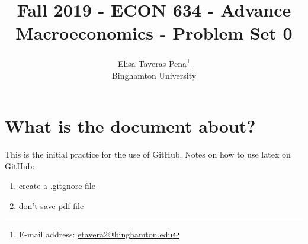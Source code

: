 \documentclass[12pt]{article}%
\begin{document}
\title{Fall 2019 - ECON 634 - Advance Macroeconomics - Problem Set 0}
\author{Elisa Taveras Pena\footnote{E-mail address: \href{mailto:etavera2@binghamton.edu}{etavera2@binghamton.edu}  }\\
Binghamton University}
\maketitle

\sloppy%

\onehalfspacing

\section{What is the document about?}

This is the initial practice for the use of GitHub. Notes on how to use latex on GitHub:

\begin{enumerate}
\item create a .gitgnore file 
\item don't save pdf file
\end{enumerate}

\strut


\onehalfspacing
\end{document}
